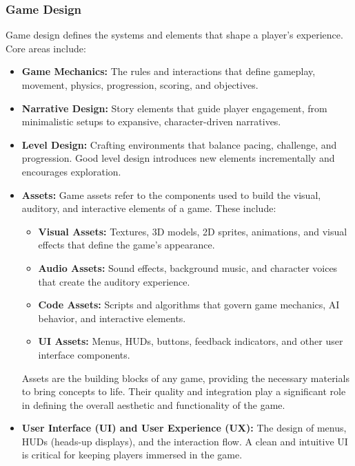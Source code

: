 \documentclass[12pt,oneside,openright,a4paper]{cpe-english-project}
\begin{document}
\subsubsection{Game Design}
Game design defines the systems and elements that shape a player's experience. Core areas include:
\begin{itemize}
\item  \textbf{Game Mechanics:}
The rules and interactions that define gameplay, movement, physics, progression, scoring, and objectives.
\item  \textbf{Narrative Design:}
Story elements that guide player engagement, from minimalistic setups to expansive, character-driven narratives.
\item  \textbf{Level Design:}
Crafting environments that balance pacing, challenge, and progression. Good level design introduces new elements incrementally and encourages exploration.
\item  \textbf{Assets:}
Game assets refer to the components used to build the visual, auditory, and interactive elements of a game. These include:
\begin{itemize}
\item  \textbf{Visual Assets:} Textures, 3D models, 2D sprites, animations, and visual effects that define the game's appearance.
\item  \textbf{Audio Assets:} Sound effects, background music, and character voices that create the auditory experience.
\item  \textbf{Code Assets:} Scripts and algorithms that govern game mechanics, AI behavior, and interactive elements.
\item  \textbf{UI Assets:} Menus, HUDs, buttons, feedback indicators, and other user interface components.
\end{itemize}
Assets are the building blocks of any game, providing the necessary materials to bring concepts to life. Their quality and integration play a significant role in defining the overall aesthetic and functionality of the game.
\item  \textbf{User Interface (UI) and User Experience (UX):}
The design of menus, HUDs (heads-up displays), and the interaction flow. A clean and intuitive UI is critical for keeping players immersed in the game.
\end{itemize}
\end{document}
